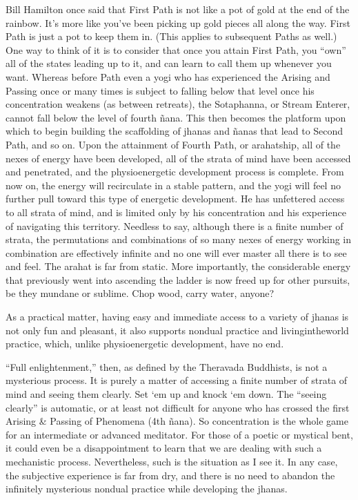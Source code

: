 \documentclass[a5paper,10pt,english]{book}
\begin{document}
\sphinxAtStartPar
Bill Hamilton once said that First Path is not like a pot of gold at the
end of the rainbow. It’s more like you’ve been picking up gold pieces all
along the way. First Path is just a pot to keep them in. (This applies
to subsequent Paths as well.) One way to think of it is to consider that
once you attain First Path, you “own” all of the states leading up to
it, and can learn to call them up whenever you want. Whereas before Path
even a yogi who has experienced the Arising and Passing once or many
times is subject to falling below that level once his concentration
weakens (as between retreats), the Sotaphanna, or Stream Enterer, cannot
fall below the level of fourth ñana. This then becomes the platform upon
which to begin building the scaffolding of jhanas and ñanas that lead to
Second Path, and so on. Upon the attainment of Fourth Path, or
arahatship, all of the nexes of energy have been developed, all of the
strata of mind have been accessed and penetrated, and the physioenergetic
development process is complete. From now on, the energy will
recirculate in a stable pattern, and the yogi will feel no further pull
toward this type of energetic development. He has unfettered access to
all strata of mind, and is limited only by his concentration and his
experience of navigating this territory. Needless to say, although there
is a finite number of strata, the permutations and combinations of so
many nexes of energy working in combination are effectively infinite and
no one will ever master all there is to see and feel. The arahat is far
from static. More importantly, the considerable energy that previously
went into ascending the ladder is now freed up for other pursuits, be
they mundane or sublime. Chop wood, carry water, anyone?

\sphinxAtStartPar
As a practical matter, having easy and immediate access to a variety of
jhanas is not only fun and pleasant, it also supports non\sphinxhyphen{}dual practice
and living\sphinxhyphen{}in\sphinxhyphen{}the\sphinxhyphen{}world practice, which, unlike physio\sphinxhyphen{}energetic
development, have no end.

\sphinxAtStartPar
“Full enlightenment,” then, as defined by the Theravada Buddhists, is
not a mysterious process. It is purely a matter of accessing a finite
number of strata of mind and seeing them clearly. Set ‘em up and knock
‘em down. The “seeing clearly” is automatic, or at least not difficult
for anyone who has crossed the first Arising \& Passing of Phenomena (4th
ñana). So concentration is the whole game for an intermediate or
advanced meditator. For those of a poetic or mystical bent, it could
even be a disappointment to learn that we are dealing with such a
mechanistic process. Nevertheless, such is the situation as I see it. In
any case, the subjective experience is far from dry, and there is no
need to abandon the infinitely mysterious non\sphinxhyphen{}dual practice while
developing the jhanas.



\renewcommand{\indexname}{Index}
\printindex
\end{document}

